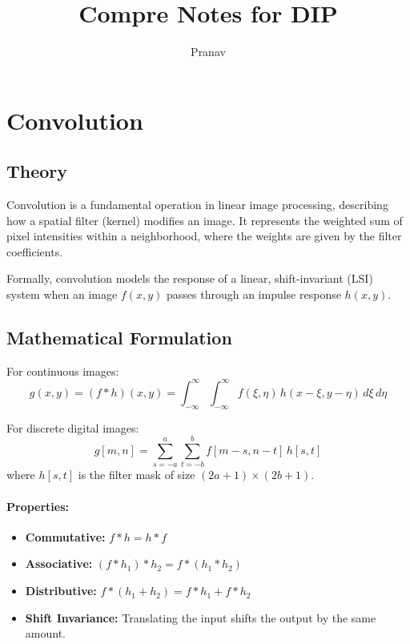\documentclass{AnantDocumentation}
\title{Compre Notes for DIP}
\author{Pranav}
\begin{document}
\maketitle
\tableofcontents
\section{Convolution}

\subsection{Theory}

Convolution is a fundamental operation in linear image processing, describing how a spatial filter (kernel) modifies an image.  
It represents the weighted sum of pixel intensities within a neighborhood, where the weights are given by the filter coefficients.  

Formally, convolution models the response of a linear, shift-invariant (LSI) system when an image $f(x, y)$ passes through an impulse response $h(x, y)$.

\subsection{Mathematical Formulation}

For continuous images:
\begin{equation}
g(x, y) = (f * h)(x, y) = \int_{-\infty}^{\infty}\int_{-\infty}^{\infty} f(\xi, \eta)\, h(x - \xi, y - \eta) \, d\xi \, d\eta
\end{equation}

For discrete digital images:
\begin{equation}
g[m, n] = \sum_{s=-a}^{a}\sum_{t=-b}^{b} f[m - s, n - t] \, h[s, t]
\end{equation}
where $h[s, t]$ is the filter mask of size $(2a + 1) \times (2b + 1)$.

\paragraph{Properties:}
\begin{itemize}
\item \textbf{Commutative:} $f * h = h * f$
\item \textbf{Associative:} $(f * h_1) * h_2 = f * (h_1 * h_2)$
\item \textbf{Distributive:} $f * (h_1 + h_2) = f * h_1 + f * h_2$
\item \textbf{Shift Invariance:} Translating the input shifts the output by the same amount.
\end{itemize}
\end{document}
